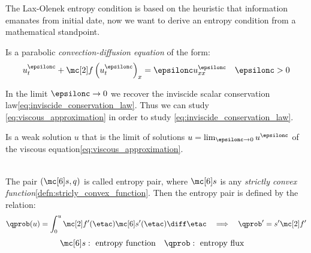 \begin{sectionbox}\nospacing
    The Lax-Olenek entropy condition is based on the heuristic that information emanates from initial date, now we want to derive an entropy condition from a mathematical standpoint.
\end{sectionbox}
\begin{propositionbox}\nospacing
    \begin{proposition}\label{proposition:viscous_approximation}
        Is a parabolic \textit{convection-diffusion equation} of the form:
        \begin{align}
          u_{t}^{\epsilonc}+\flux \left(u_{t}^{\epsilonc}\right)_{x}=\epsilonc u^{\epsilonc}_{xx}&&\epsilonc>0\label{eq:viscous_approximation}
        \end{align}
    \end{proposition}
\end{propositionbox}
\begin{sectionbox}[Idea]\nospacing
    In the limit $\epsilonc\to0$ we recover the inviscide scalar conservation law\cref{eq:inviscide_conservation_law}.
    Thus we can study \cref{eq:viscous_approximation} in order to study \cref{eq:inviscide_conservation_law}.
\end{sectionbox}
\begin{defnbox}\nospacing
    \begin{defn}\label{defn:vanishing_viscosity_solution}
        Is a weak solution $u$ that is the limit of solutions $u=\lim_{\epsilonc\to0}u^{\epsilonc}$ of the viscous equation\cref{eq:viscous_approximation}.
    \end{defn}
\end{defnbox}
\begin{defnbox}\nospacing
    \begin{defn}\label{defn:entropy_function}\leavevmode\\
        The pair $(\entropy,q)$ is called entropy pair, where $\entropy$ is any \textit{strictly convex function}\cref{defn:stricly_convex_function}.
        Then the entropy pair is defined by the relation:
        \begin{align}
          \qprob(u)=\int_{0}^{u}\flux'(\etac)\entropy'(\etac)\diff\etac&&\implies&&\qprob'=s'\flux'
        \end{align}
        \begin{align*}
          \entropy:\text{ entropy function}&& \qprob:\text{ entropy flux}&&
        \end{align*}
    \end{defn}
\end{defnbox}
